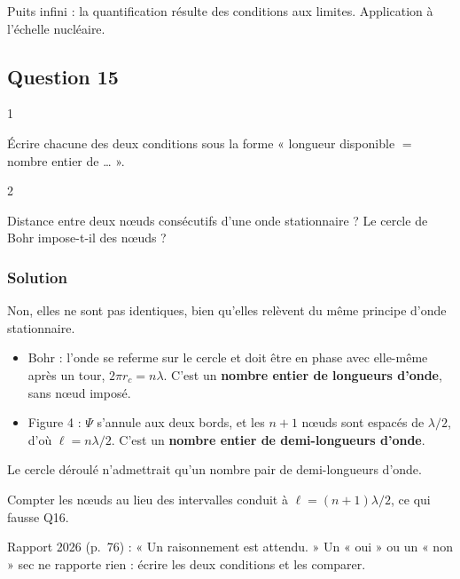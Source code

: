 \documentclass[11pt,a4paper]{article}
\providecommand{\tightlist}{\setlength{\itemsep}{0pt}\setlength{\parskip}{0pt}}
\begin{document}
Puits infini : la quantification résulte des conditions aux limites. Application à l'échelle nucléaire.

\hypertarget{question-15}{%
\subsection{Question 15}\label{question-15}}

\begin{indication}{1}

Écrire chacune des deux conditions sous la forme « longueur disponible \(=\) nombre entier de \ldots{} ».

\end{indication}

\begin{indication}{2}

Distance entre deux nœuds consécutifs d'une onde stationnaire ? Le cercle de Bohr impose-t-il des nœuds ?

\end{indication}

\hypertarget{solution-14}{%
\subsubsection{Solution}\label{solution-14}}

Non, elles ne sont pas identiques, bien qu'elles relèvent du même principe d'onde stationnaire.

\begin{itemize}
\tightlist
\item
  Bohr : l'onde se referme sur le cercle et doit être en phase avec elle-même après un tour, \(2\pi r_c=n\lambda\). C'est un \textbf{nombre entier de longueurs d'onde}, sans nœud imposé.
\item
  Figure 4 : \(\Psi\) s'annule aux deux bords, et les \(n+1\) nœuds sont espacés de \(\lambda/2\), d'où \(\ell=n\lambda/2\). C'est un \textbf{nombre entier de demi-longueurs d'onde}.
\end{itemize}

Le cercle déroulé n'admettrait qu'un nombre pair de demi-longueurs d'onde.

\begin{piege}

Compter les nœuds au lieu des intervalles conduit à \(\ell=(n+1)\lambda/2\), ce qui fausse Q16.

\end{piege}

\begin{jury}

Rapport 2026 (p.~76) : « Un raisonnement est attendu. » Un « oui » ou un « non » sec ne rapporte rien : écrire les deux conditions et les comparer.

\end{jury}
\end{document}
